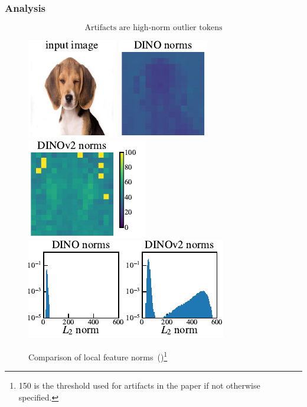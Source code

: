 \documentclass[aspectratio=169]{beamer}
\begin{document}
\begin{frame}
\frametitle{Analysis}

$$\boxed{\text{Artifacts are high-norm outlier tokens}}$$

\vspace{2em}
\begin{figure}[t]
    \includegraphics{resources/figure_3_1.pdf} 
    \includegraphics{resources/figure_3_2.pdf} 
    \includegraphics{resources/figure_3_3.pdf} 
    \includegraphics{resources/figure_3_4.pdf} 
    \caption{
      Comparison of local feature norms~(\cite{darcetVisionTransformersNeed2024})\footnote{150 is the threshold used for artifacts in the paper if not otherwise specified.}
    }  
    \label{fig:norms_hist}
\end{figure}
\end{frame}
\end{document}
